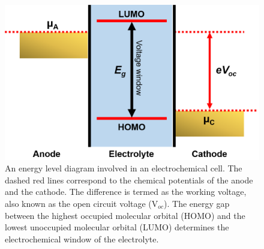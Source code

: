 \begin{figure}[tbh!]
\centering
\includegraphics[width=\textwidth]{Figures/chap1fig/energy}
\caption{An energy level diagram involved in an electrochemical cell. The dashed red lines correspond to the chemical potentials of the anode and the cathode. The difference is termed as the working voltage, also known as the open circuit voltage (V$_{oc}$). The energy gap between the highest occupied molecular orbital (HOMO) and the lowest unoccupied molecular orbital (LUMO) determines the electrochemical window of the electrolyte.}
\label{Figures/chap1fig:energy}
\end{figure}

